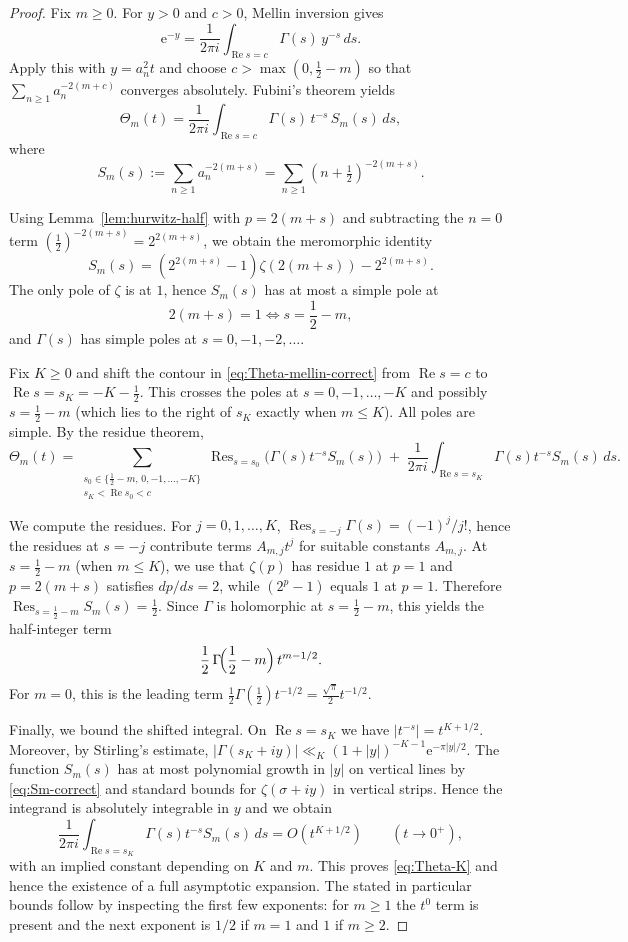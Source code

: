\documentclass[11pt,letterpaper]{amsart}
\numberwithin{equation}{section}
\theoremstyle{definition}
\newcommand{\Ree}{\operatorname{Re}}
\newcommand{\e}{\mathrm{e}}
\newcommand{\Res}{\operatorname{Res}}
\begin{document}
\begin{proof}
Fix $m\ge 0$. For $y>0$ and $c>0$, Mellin inversion gives
\[
\e^{-y}=\frac{1}{2\pi i}\int_{\Ree s=c}\Gamma(s)\,y^{-s}\,ds.
\]
Apply this with $y=a_n^2 t$ and choose $c>\max(0,\tfrac12-m)$ so that
$\sum_{n\ge 1}a_n^{-2(m+c)}$ converges absolutely. Fubini's theorem yields
\begin{equation}\label{eq:Theta-mellin-correct}
\Theta_m(t)=\frac{1}{2\pi i}\int_{\Ree s=c}\Gamma(s)\,t^{-s}\,S_m(s)\,ds,
\end{equation}
where
\[
S_m(s):=\sum_{n\ge 1}a_n^{-2(m+s)}=\sum_{n\ge 1}(n+\tfrac12)^{-2(m+s)}.
\]

Using Lemma~\ref{lem:hurwitz-half} with $p=2(m+s)$ and subtracting the $n=0$ term
$(\tfrac12)^{-2(m+s)}=2^{2(m+s)}$, we obtain the meromorphic identity
\begin{equation}\label{eq:Sm-correct}
S_m(s)=(2^{2(m+s)}-1)\zeta(2(m+s)) - 2^{2(m+s)}.
\end{equation}
The only pole of $\zeta$ is at $1$, hence $S_m(s)$ has at most a simple pole at
\[
2(m+s)=1\iff s=\frac12-m,
\]
and $\Gamma(s)$ has simple poles at $s=0,-1,-2,\dots$.

Fix $K\ge 0$ and shift the contour in \eqref{eq:Theta-mellin-correct} from $\Ree s=c$ to $\Ree s=s_K=-K-\tfrac12$. This crosses the poles at $s=0,-1,\dots,-K$ and possibly
$s=\frac12-m$ (which lies to the right of $s_K$ exactly when $m\le K$). All poles are simple.
By the residue theorem,
\[
\Theta_m(t)
=\sum_{\substack{s_0\in\{\frac12-m,\,0,-1,\dots,-K\}\\ s_K<\Ree s_0<c}}
\Res_{s=s_0}\bigl(\Gamma(s)t^{-s}S_m(s)\bigr)
\;+\;\frac{1}{2\pi i}\int_{\Ree s=s_K}\Gamma(s)t^{-s}S_m(s)\,ds.
\]

We compute the residues.
For $j=0,1,\dots,K$, $\Res_{s=-j}\Gamma(s)=(-1)^j/j!$, hence the residues at $s=-j$ contribute
terms $A_{m,j}t^{j}$ for suitable constants $A_{m,j}$.
At $s=\frac12-m$ (when $m\le K$), we use that $\zeta(p)$ has residue $1$ at $p=1$ and
$p=2(m+s)$ satisfies $dp/ds=2$, while $(2^p-1)$ equals $1$ at $p=1$. Therefore
$\Res_{s=\frac12-m}S_m(s)=\frac12$. Since $\Gamma$ is holomorphic at $s=\frac12-m$,
this yields the half-integer term
\[
\frac12\,\Gamma\!\Bigl(\frac12-m\Bigr)\,t^{m-1/2}.
\]
For $m=0$, this is the leading term $\frac12\Gamma(\tfrac12)t^{-1/2}=\frac{\sqrt\pi}{2}t^{-1/2}$.

Finally, we bound the shifted integral. On $\Ree s=s_K$ we have $|t^{-s}|=t^{K+1/2}$.
Moreover, by Stirling's estimate,
$|\Gamma(s_K+iy)|\ll_K (1+|y|)^{-K-1}\e^{-\pi|y|/2}$.
The function $S_m(s)$ has at most polynomial growth in $|y|$ on vertical lines by
\eqref{eq:Sm-correct} and standard bounds for $\zeta(\sigma+iy)$ in vertical strips.
Hence the integrand is absolutely integrable in $y$ and we obtain
\[
\frac{1}{2\pi i}\int_{\Ree s=s_K}\Gamma(s)t^{-s}S_m(s)\,ds=O(t^{K+1/2})
\qquad(t\to 0^+),
\]
with an implied constant depending on $K$ and $m$.
This proves \eqref{eq:Theta-K} and hence the existence of a full asymptotic expansion.
The stated in particular bounds follow by inspecting the first few exponents:
for $m\ge 1$ the $t^0$ term is present and the next exponent is $1/2$ if $m=1$
and $1$ if $m\ge 2$.
\end{proof}
\end{document}
